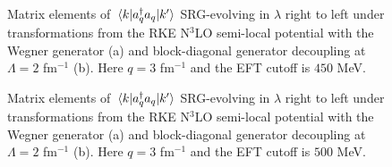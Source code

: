 \documentclass[preprintnumbers,floatfix,aps,prc,preprint,nofootinbib]{revtex4-1}
\begin{document}
\begin{figure}[H]
	\centering
	
	\caption{Matrix elements of $\mel{k}{a^{\dagger}_q a_q}{k'}$ SRG-evolving in $\lambda$ right to left under transformations from the RKE N$^3$LO semi-local potential with the Wegner generator (a) and block-diagonal generator decoupling at $\Lambda=2$ fm$^{-1}$ (b). Here $q=3$ fm$^{-1}$ and the EFT cutoff is $450$ MeV.}
	\label{momentum_projection_contours_q3,00_kvnn106}
\end{figure}

\begin{figure}[H]
	\centering
	
	\caption{Matrix elements of $\mel{k}{a^{\dagger}_q a_q}{k'}$ SRG-evolving in $\lambda$ right to left under transformations from the RKE N$^3$LO semi-local potential with the Wegner generator (a) and block-diagonal generator decoupling at $\Lambda=2$ fm$^{-1}$ (b). Here $q=3$ fm$^{-1}$ and the EFT cutoff is $500$ MeV.}
	\label{momentum_projection_contours_q3,00_kvnn107}
\end{figure}
\end{document}
